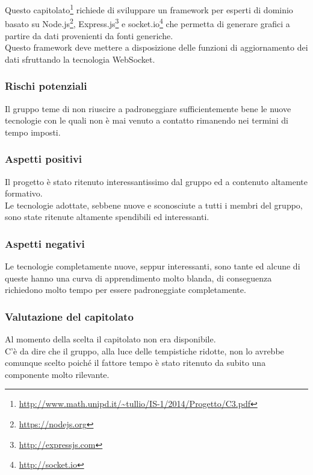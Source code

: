 Questo capitolato\footnote{\url{http://www.math.unipd.it/~tullio/IS-1/2014/Progetto/C3.pdf} } richiede di sviluppare un framework per esperti di dominio basato su Node.js\footnote{\url{https://nodejs.org}}, Express.js\footnote{\url{http://expressjs.com}} e socket.io\footnote{\url{http://socket.io}} che permetta di generare grafici a partire da dati provenienti da fonti generiche. \\
Questo framework deve mettere a disposizione delle funzioni di aggiornamento dei dati sfruttando la tecnologia WebSocket.
\subsubsection{Rischi potenziali} 
Il gruppo teme di non riuscire a padroneggiare sufficientemente bene le nuove tecnologie con le quali non è mai venuto a contatto rimanendo nei termini di tempo imposti.
\subsubsection{Aspetti positivi}
Il progetto è stato ritenuto interessantissimo dal gruppo ed a contenuto altamente formativo. \\
Le tecnologie adottate, sebbene nuove e sconosciute a tutti i membri del gruppo, sono state ritenute altamente spendibili ed interessanti.
\subsubsection{Aspetti negativi}
Le tecnologie completamente nuove, seppur interessanti, sono tante ed alcune di queste hanno una curva di apprendimento molto blanda, di conseguenza richiedono molto tempo per essere padroneggiate completamente.
\subsubsection{Valutazione del capitolato}
Al momento della scelta il capitolato non era disponibile.\\ C’è da dire che il gruppo, alla luce delle tempistiche ridotte, non lo avrebbe comunque scelto poiché il fattore tempo è stato ritenuto da subito una componente molto rilevante.
